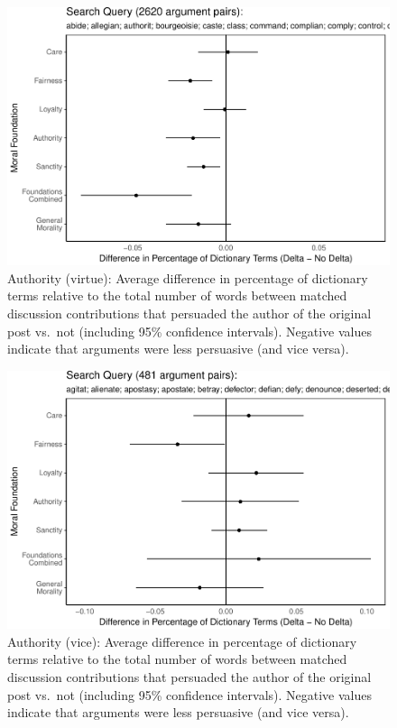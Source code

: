\documentclass[12pt,]{article}
\begin{document}
\begin{figure}
\centering
\includegraphics{prelim_files/figure-latex/authority virtue-1.pdf}
\caption{Authority (virtue): Average difference in percentage of
dictionary terms relative to the total number of words between matched
discussion contributions that persuaded the author of the original post
vs.~not (including 95\% confidence intervals). Negative values indicate
that arguments were less persuasive (and vice versa).}
\end{figure}

\begin{figure}
\centering
\includegraphics{prelim_files/figure-latex/authority vice-1.pdf}
\caption{Authority (vice): Average difference in percentage of
dictionary terms relative to the total number of words between matched
discussion contributions that persuaded the author of the original post
vs.~not (including 95\% confidence intervals). Negative values indicate
that arguments were less persuasive (and vice versa).}
\end{figure}
\end{document}

